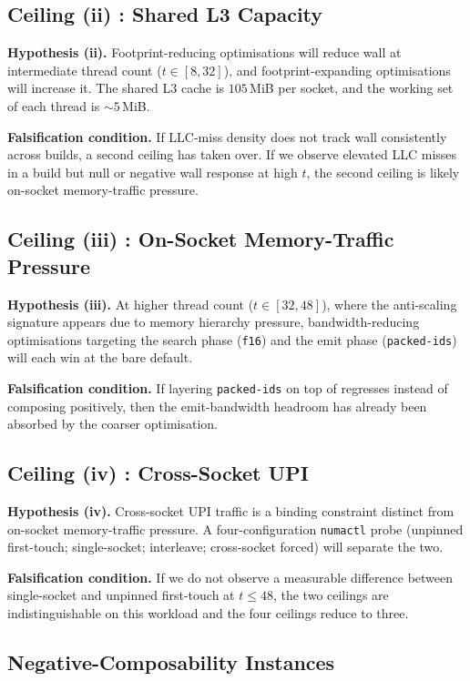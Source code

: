 \subsection{Ceiling (ii)  :  Shared L3 Capacity}

\textbf{Hypothesis (ii).} Footprint-reducing optimisations will reduce wall at intermediate thread count ($t \in [8, 32]$), and footprint-expanding optimisations will increase it. The shared L3 cache is $105$\,MiB per socket, and the working set of each thread is $\sim\!5$\,MiB.

\textbf{Falsification condition.} If LLC-miss density does not track wall consistently across builds, a second ceiling has taken over. If we observe elevated LLC misses in a build but null or negative wall response at high $t$, the second ceiling is likely on-socket memory-traffic pressure.

\subsection{Ceiling (iii)  :  On-Socket Memory-Traffic Pressure}

\textbf{Hypothesis (iii).} At higher thread count ($t \in [32, 48]$), where the anti-scaling signature appears due to memory hierarchy pressure, bandwidth-reducing optimisations targeting the search phase (\texttt{f16}) and the emit phase (\texttt{packed-ids}) will each win at the bare default.

\textbf{Falsification condition.} If layering \texttt{packed-ids} on top of \bcombo{} regresses instead of composing positively, then the emit-bandwidth headroom has already been absorbed by the coarser optimisation.


\subsection{Ceiling (iv)  :  Cross-Socket UPI}

\textbf{Hypothesis (iv).} Cross-socket UPI traffic is a binding constraint distinct from on-socket memory-traffic pressure. A four-configuration \texttt{numactl} probe (unpinned first-touch; single-socket; interleave; cross-socket forced) will separate the two.

\textbf{Falsification condition.} If we do not observe a measurable difference between single-socket and unpinned first-touch at $t \leq 48$, the two ceilings are indistinguishable on this workload and the four ceilings reduce to three.

\subsection{Negative-Composability Instances}

